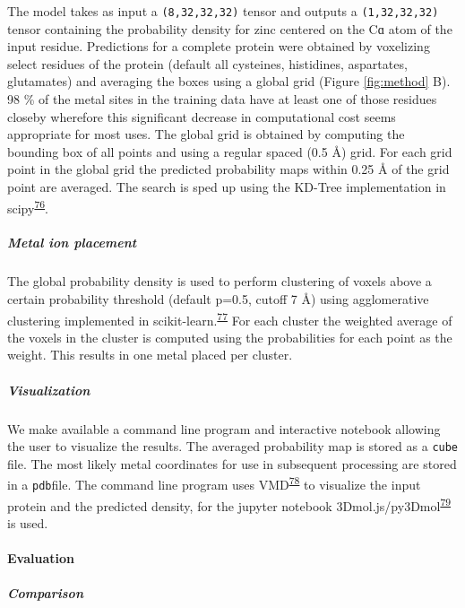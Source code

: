 \documentclass[  ASAPversion,
  ,
  9pt]{elife}
\begin{document}
The model takes as input a \texttt{(8,32,32,32)} tensor and outputs a \texttt{(1,32,32,32)} tensor containing the probability density for zinc centered on the Cɑ atom of the input residue.
Predictions for a complete protein were obtained by voxelizing select residues of the protein (default all cysteines, histidines, aspartates, glutamates) and averaging the boxes using a global grid (Figure \ref{fig:method} B). 98 \% of the metal sites in the training data have at least one of those residues closeby wherefore this significant decrease in computational cost seems appropriate for most uses. The global grid is obtained by computing the bounding box of all points and using a regular spaced (0.5 Å) grid. For each grid point in the global grid the predicted probability maps within 0.25 Å of the grid point are averaged. The search is sped up using the KD-Tree implementation in scipy\textsuperscript{\protect\hyperlink{ref-8Miti2Gz}{76}}.

\hypertarget{metal-ion-placement}{%
\subparagraph{Metal ion placement}\label{metal-ion-placement}}

The global probability density is used to perform clustering of voxels above a certain probability threshold (default p=0.5, cutoff 7 Å) using agglomerative clustering implemented in scikit-learn.\textsuperscript{\protect\hyperlink{ref-AujvwLp6}{77}} For each cluster the weighted average of the voxels in the cluster is computed using the probabilities for each point as the weight. This results in one metal placed per cluster.

\hypertarget{visualization}{%
\subparagraph{Visualization}\label{visualization}}

We make available a command line program and interactive notebook allowing the user to visualize the results. The averaged probability map is stored as a \texttt{cube} file. The most likely metal coordinates for use in subsequent processing are stored in a \texttt{pdb}file. The command line program uses VMD\textsuperscript{\protect\hyperlink{ref-PEXAwV3k}{78}} to visualize the input protein and the predicted density, for the jupyter notebook 3Dmol.js/py3Dmol\textsuperscript{\protect\hyperlink{ref-BguJBlg6}{79}} is used.

\hypertarget{evaluation}{%
\paragraph{Evaluation}\label{evaluation}}

\hypertarget{comparison}{%
\subparagraph{Comparison}\label{comparison}}
\end{document}
